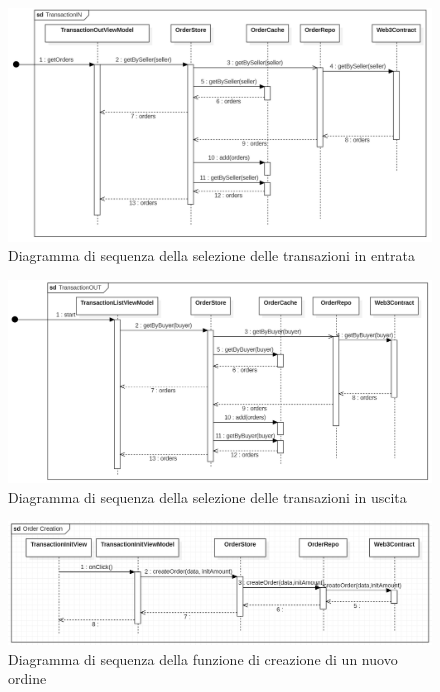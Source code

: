 \begin{landscape}
    \begin{figure}[H]
        \begin{center}
        \includegraphics[scale=0.7]{immagini/TransactionIN.png}
        \caption{Diagramma di sequenza della selezione delle transazioni in entrata}
        \end{center}
    \end{figure}
\end{landscape}

\begin{landscape}
    \begin{figure}[H]
        \begin{center}
        \includegraphics[scale=0.7]{immagini/TransactionOUT.png}
        \caption{Diagramma di sequenza della selezione delle transazioni in uscita}
        \end{center}
    \end{figure}
\end{landscape}

\begin{figure}[H]
    \begin{center}
    \includegraphics[width=\textwidth]{immagini/ordercreation.png}
    \caption{Diagramma di sequenza della funzione di creazione di un nuovo ordine}
    \end{center}
\end{figure}

